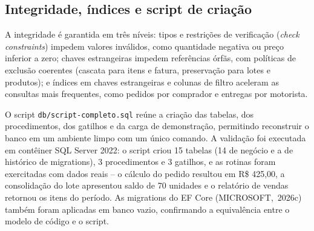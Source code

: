 \subsection{Integridade, índices e script de criação}

A integridade é garantida em três níveis: tipos e restrições de verificação
(\emph{check constraints}) impedem valores inválidos, como quantidade negativa
ou preço inferior a zero; chaves estrangeiras impedem referências órfãs, com
políticas de exclusão coerentes (cascata para itens e fatura, preservação para
lotes e produtos); e índices em chaves estrangeiras e colunas de filtro aceleram
as consultas mais frequentes, como pedidos por comprador e entregas por
motorista.

O script \texttt{db/script-completo.sql} reúne a criação das tabelas, dos
procedimentos, dos gatilhos e da carga de demonstração, permitindo reconstruir o
banco em um ambiente limpo com um único comando. A validação foi executada em
contêiner SQL Server 2022: o script criou 15 tabelas (14 de negócio e a de
histórico de migrations), 3 procedimentos e 3 gatilhos, e as rotinas foram
exercitadas com dados reais -- o cálculo do pedido resultou em R\$ 425,00, a
consolidação do lote apresentou saldo de 70 unidades e o relatório de vendas
retornou os itens do período. As migrations do EF Core \mbox{(MICROSOFT, 2026c)} também foram aplicadas em
banco vazio, confirmando a equivalência entre o modelo de código e o script.
